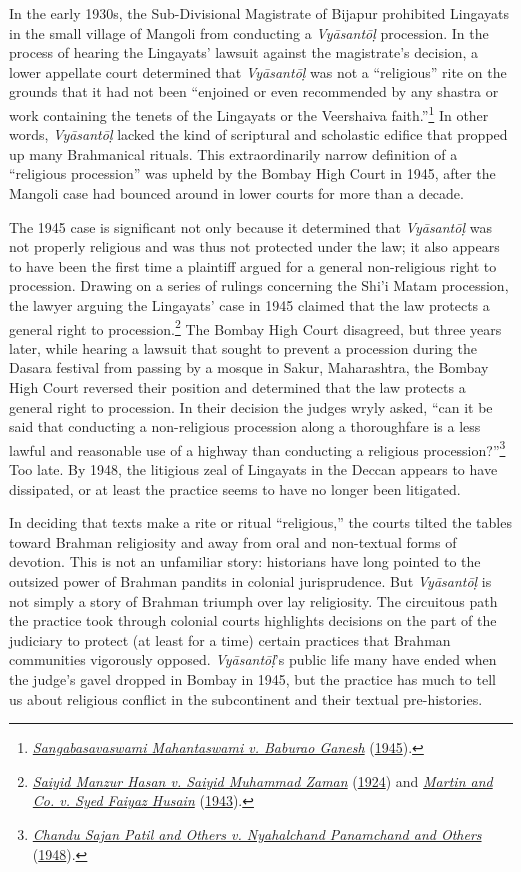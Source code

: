 In the early 1930s, the Sub-Divisional Magistrate of Bijapur prohibited Lingayats in the small village of Mangoli from conducting a \emph{Vyāsantōḷ} procession. In the process of hearing the Lingayats’ lawsuit against the magistrate’s decision, a lower appellate court determined that \emph{Vyāsantōḷ} was not a “religious” rite on the grounds that it had not been “enjoined or even recommended by any shastra or work containing the tenets of the Lingayats or the Veershaiva faith.”\footnote{%
\hyperref[Sangabasavaswami]{\emph{Sangabasavaswami Mahantaswami v. Baburao Ganesh}} (\hyperref[Sangabasavaswami]{1945}).
}
 In other words, \emph{Vyāsantōḷ} lacked the kind of scriptural and scholastic edifice that propped up many Brahmanical rituals. This extraordinarily narrow definition of a “religious procession” was upheld by the Bombay High Court in 1945, after the Mangoli case had bounced around in lower courts for more than a decade. 


The 1945 case is significant not only because it determined that \emph{Vyāsantōḷ} was not properly religious and was thus not protected under the law; it also appears to have been the first time a plaintiff argued for a general non-religious right to procession. Drawing on a series of rulings concerning the Shi’i Matam procession, the lawyer arguing the Lingayats’ case in 1945 claimed that the law protects a general right to procession.\footnote{%
\hyperref[Saiyid]{\emph{Saiyid Manzur Hasan v. Saiyid Muhammad Zaman}} (\hyperref[Saiyid]{1924}) and \hyperref[Martin]{\emph{Martin and Co. v. Syed Faiyaz Husain}} (\hyperref[Martin]{1943}).
}
 The Bombay High Court disagreed, but three years later, while hearing a lawsuit that sought to prevent a procession during the Dasara festival from passing by a mosque in Sakur, Maharashtra, the Bombay High Court reversed their position and determined that the law protects a general right to procession. In their decision the judges wryly asked, “can it be said that conducting a non-religious procession along a thoroughfare is a less lawful and reasonable use of a highway than conducting a religious procession?”\footnote{%
\hyperref[Chandu]{\emph{Chandu Sajan Patil and Others v. Nyahalchand Panamchand and Others}} (\hyperref[Chandu]{1948}).
}
 Too late. By 1948, the litigious zeal of Lingayats in the Deccan appears to have dissipated, or at least the practice seems to have no longer been litigated.


In deciding that texts make a rite or ritual “religious,” the courts tilted the tables toward Brahman religiosity and away from oral and non-textual forms of devotion. This is not an unfamiliar story: historians have long pointed to the outsized power of Brahman pandits in colonial jurisprudence. But \emph{Vyāsantōḷ} is not simply a story of Brahman triumph over lay religiosity. The circuitous path the practice took through colonial courts highlights decisions on the part of the judiciary to protect (at least for a time) certain practices that Brahman communities vigorously opposed. \emph{Vyāsantōḷ}’s public life many have ended when the judge’s gavel dropped in Bombay in 1945, but the practice has much to tell us about religious conflict in the subcontinent and their textual pre-histories. 


